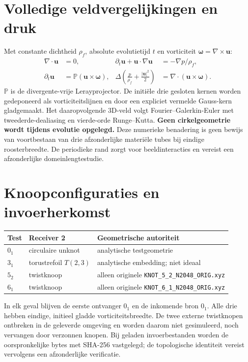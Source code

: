 \documentclass[10pt,a4paper]{article}
\newcommand{\rhoF}{\rho_{\!f}}\newcommand{\rc}{r_c}\newcommand{\vswirl}{\mathbf{v}_{\!\boldsymbol{\circlearrowleft}}}
\begin{document}
\section{Volledige veldvergelijkingen en druk}
Met constante dichtheid $\rhoF$, absolute evolutietijd $t$ en vorticiteit $\boldsymbol\omega=\nabla\times\mathbf{u}$:
\begin{align}
\nabla\cdot\mathbf{u}&=0, &
\partial_t\mathbf{u}+\mathbf{u}\cdot\nabla\mathbf{u}&=-\nabla p/\rhoF,\\
\partial_t\mathbf{u}&=\mathbb{P}(\mathbf{u}\times\boldsymbol\omega), &
\Delta\left(\frac p{\rhoF}+\frac{|\mathbf{u}|^2}2\right)&=\nabla\cdot(\mathbf{u}\times\boldsymbol\omega).
\end{align}
\noindent$\mathbb{P}$ is de divergente-vrije Lerayprojector. De initi\"ele drie gesloten kernen worden gedeponeerd als vorticiteitslijnen en door een expliciet vermelde Gauss-kern gladgemaakt. Het daaropvolgende 3D-veld volgt Fourier--Galerkin-Euler met tweederde-dealiasing en vierde-orde Runge--Kutta. \textbf{Geen cirkelgeometrie wordt tijdens evolutie opgelegd.} Deze numerieke benadering is geen bewijs van voortbestaan van drie afzonderlijke materiële tubes bij eindige roosterbreedte. De periodieke rand zorgt voor beeldinteracties en vereist een afzonderlijke domeinlengtestudie.
\section{Knoopconfiguraties en invoerherkomst}
\begin{center}\begin{tabular}{lll}\toprule
Test & Receiver 2 & Geometrische autoriteit\\\midrule
$0_1$ & circulaire unknot & analytische testgeometrie\\
$3_1$ & torustrefoil $T(2,3)$ & analytische embedding; niet ideaal\\
$5_2$ & twistknoop & alleen originele \texttt{KNOT\_5\_2\_N2048\_ORIG.xyz}\\
$6_1$ & twistknoop & alleen originele \texttt{KNOT\_6\_1\_N2048\_ORIG.xyz}\\\bottomrule
\end{tabular}\end{center}
In elk geval blijven de eerste ontvanger $0_1$ en de inkomende bron $0_1$. Alle drie hebben eindige, initieel gladde vorticiteitsbreedte. De twee externe twistknopen ontbreken in de geleverde omgeving en worden daarom niet gesimuleerd, noch vervangen door verzonnen knopen. Bij geladen invoerbestanden worden de oorspronkelijke bytes met SHA-256 vastgelegd; de topologische identiteit vereist vervolgens een afzonderlijke verificatie.
\end{document}

